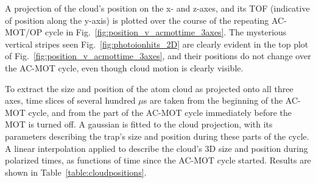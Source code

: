 A projection of the cloud's position on the x- and z-axes, and its TOF (indicative of position along the y-axis) is plotted over the course of the repeating AC-MOT/OP cycle in Fig.~\ref{fig:position_v_acmottime_3axes}. The mysterious vertical stripes seen Fig.~\ref{fig:photoionhits_2D} are clearly evident in the top plot of Fig.~\ref{fig:position_v_acmottime_3axes}, and their positions do not change over the AC-MOT cycle, even though cloud motion is clearly visible.  
 

To extract the size and position of the atom cloud as projected onto all three axes, time slices of several hundred $\mu$s are taken from the beginning of the AC-MOT cycle, and from the part of the AC-MOT cycle immediately before the MOT is turned off.  A gaussian is fitted to the cloud projection, with its parameters describing the trap's size and position during these parts of the cycle.  A linear interpolation applied to describe the cloud's 3D size and position during polarized times, as functions of time since the AC-MOT cycle started.  Results are shown in Table~\ref{table:cloudpositions}.



\FloatBarrier %



